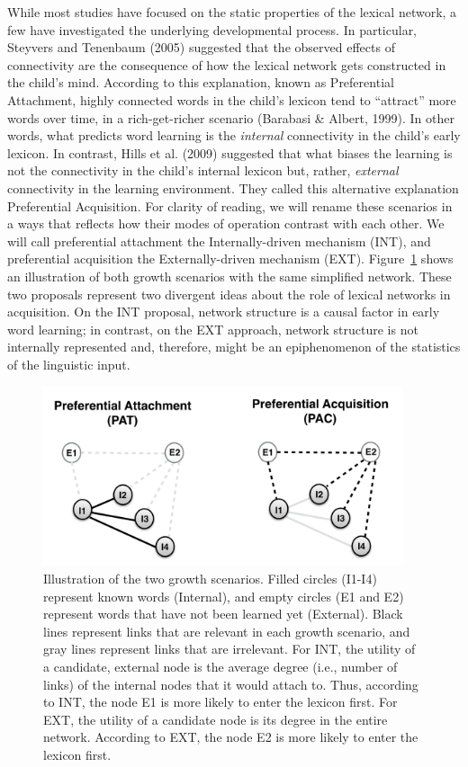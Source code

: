 \documentclass[english,floatsintext,man]{apa6}
\theoremstyle{definition}
\theoremstyle{definition}
\theoremstyle{definition}
\theoremstyle{remark}
\begin{document}
While most studies have focused on the static properties of the lexical
network, a few have investigated the underlying developmental process.
In particular, Steyvers and Tenenbaum (2005) suggested that the observed
effects of connectivity are the consequence of how the lexical network
gets constructed in the child's mind. According to this explanation,
known as Preferential Attachment, highly connected words in the child's
lexicon tend to \enquote{attract} more words over time, in a
rich-get-richer scenario (Barabasi \& Albert, 1999). In other words,
what predicts word learning is the \emph{internal} connectivity in the
child's early lexicon. In contrast, Hills et al. (2009) suggested that
what biases the learning is not the connectivity in the child's internal
lexicon but, rather, \emph{external} connectivity in the learning
environment. They called this alternative explanation Preferential
Acquisition. For clarity of reading, we will rename these scenarios in a
ways that reflects how their modes of operation contrast with each
other. We will call preferential attachment the Internally-driven
mechanism (INT), and preferential acquisition the Externally-driven
mechanism (EXT). Figure~\ref{fig:growth} shows an illustration of both
growth scenarios with the same simplified network. These two proposals
represent two divergent ideas about the role of lexical networks in
acquisition. On the INT proposal, network structure is a causal factor
in early word learning; in contrast, on the EXT approach, network
structure is not internally represented and, therefore, might be an
epiphenomenon of the statistics of the linguistic input.

\begin{figure}

{\centering \includegraphics[width=400px]{figs/growth2} 

}

\caption{Illustration of the two growth scenarios. Filled circles (I1-I4) represent known words (Internal), and empty circles (E1 and E2) represent words that have not been learned yet (External). Black lines represent links that are relevant in each growth scenario, and gray lines represent links that are irrelevant. For INT, the utility of a candidate, external node is the average degree (i.e., number of links) of the internal nodes that it would attach to. Thus, according to INT, the node E1 is more likely to enter the lexicon first. For EXT, the utility of a candidate node is its degree in the entire network. According to EXT, the node E2 is more likely to enter the lexicon first.}\label{fig:growth}
\end{figure}
\end{document}
